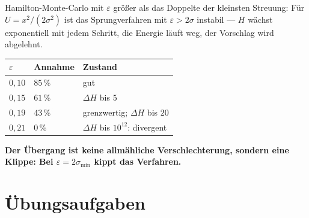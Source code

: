 \begin{warnung}
Hamilton-Monte-Carlo mit $\varepsilon$ größer als das Doppelte der kleinsten Streuung: Für $U = x^2/(2\sigma^2)$ ist das Sprungverfahren mit $\varepsilon > 2\sigma$ instabil --- $H$ wächst exponentiell mit jedem Schritt, die Energie läuft weg, der Vorschlag wird abgelehnt.

\begin{center}
{\small
\renewcommand{\arraystretch}{1.48}
\begin{tabular}{@{}P{1.6cm}P{2.4cm}P{4.0cm}@{}}
\toprule
$\varepsilon$ & \textbf{Annahme} & \textbf{Zustand}\\
\midrule
$0{,}10$ & $85\,\%$ & gut\\
$0{,}15$ & $61\,\%$ & $\Delta H$ bis $5$\\
$0{,}19$ & $43\,\%$ & grenzwertig; $\Delta H$ bis $20$\\
$0{,}21$ & $0\,\%$ & $\Delta H$ bis $10^{12}$: divergent\\
\bottomrule
\end{tabular}}
\end{center}

\begin{center}
\begin{minipage}{0.9\textwidth}
\textbf{Der Übergang ist keine allmähliche Verschlechterung, sondern eine Klippe: Bei $\varepsilon = 2\sigma_{\min}$ kippt das Verfahren.}
\end{minipage}
\end{center}

\begin{center}
\begin{minipage}{0.88\textwidth}
\end{minipage}
\end{center}
\end{warnung}

\section{Übungsaufgaben}

